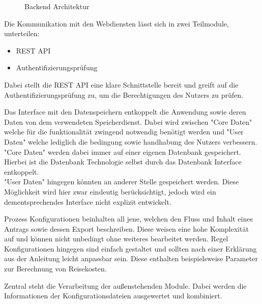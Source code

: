 \begin{figure}[h]
    
    \caption{Backend Architektur}\label{fig:BackendArch}
\end{figure}

Die Kommunikation mit den Webdiensten lässt sich in zwei Teilmodule, unterteilen:
\begin{itemize}
    \item \ac{REST} \ac{API}
    \item Authentifizierungsprüfung
\end{itemize}
Dabei stellt die \ac{REST} \ac{API} eine klare Schnittstelle bereit und greift auf die Authentifizierungsprüfung zu,
um die Berechtigungen des Nutzers zu prüfen.

Das Interface mit den Datenspeichern entkoppelt die Anwendung sowie deren Daten von dem verwendeten Speicherdienst.
Dabei wird zwischen "Core Daten" welche für die funktionalität zwingend notwendig benötigt werden
und "User Daten" welche lediglich die bedingung sowie handhabung des Nutzers verbessern.\\
"Core Daten" werden dabei immer auf einer eigenen Datenbank gespeichert.
Hierbei ist die Datenbank Technologie selbst durch das Datenbank Interface entkoppelt.\\
"User Daten" hingegen könnten an anderer Stelle gespeichert werden.
Diese Möglichkeit wird hier zwar eindeutig berücksichtigt, jedoch wird ein dementsprechendes Interface nicht explizit entwickelt.

Prozess Konfigurationen beinhalten all jene, welchen den Fluss und Inhalt eines Antrags sowie dessen Export beschreiben.
Diese weisen eine hohe Komplexität auf und können nicht unbedingt ohne weiteres bearbeitet werden.
Regel Konfigurationen hingegen sind einfach gestaltet und sollten nach einer Erklärung aus der Anleitung leicht anpassbar sein.
Diese enthalten beispielsweise Parameter zur Berechnung von Reisekosten.

Zentral steht die Verarbeitung der außenstehenden Module.
Dabei werden die Informationen der Konfigurationsdateien ausgewertet und kombiniert.
